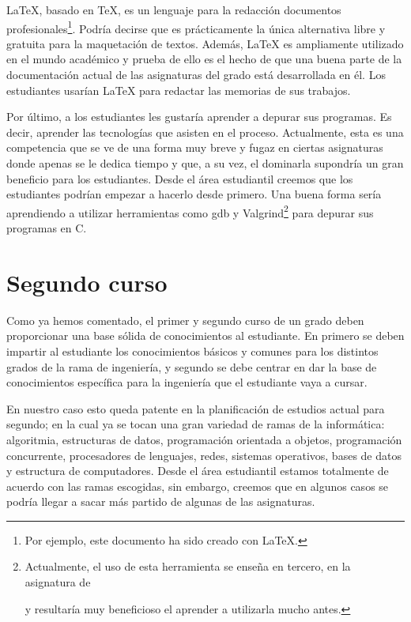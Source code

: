 \LaTeX, basado en \TeX, es un lenguaje para
la redacción documentos profesionales\footnote{
    Por ejemplo, este documento ha sido creado con \LaTeX.
}.
Podría decirse que es prácticamente la única alternativa
libre y gratuita para la maquetación de textos.
Además, \LaTeX{} es ampliamente utilizado en el mundo académico y prueba de
ello es el hecho de que una buena parte de la documentación actual de las
 asignaturas del grado está desarrollada en él.
Los estudiantes usarían \LaTeX{} para redactar las memorias de sus trabajos.

Por último, a los estudiantes les gustaría aprender a depurar sus programas.
Es decir, aprender las tecnologías que asisten en el proceso.
Actualmente, esta es una competencia que se ve de una forma muy breve y fugaz
en ciertas asignaturas donde apenas se le dedica tiempo y que, a su vez, el
dominarla supondría un gran beneficio para los estudiantes.
Desde el área estudiantil creemos que los estudiantes podrían empezar a
hacerlo desde primero.
Una buena forma sería
aprendiendo a utilizar herramientas como gdb y Valgrind\footnote{Actualmente,
 el uso de esta herramienta se enseña en tercero, en la asignatura de
 \subject{Ampliación de Sistemas Operativos} y resultaría muy beneficioso el
 aprender a utilizarla mucho antes.} para depurar sus programas en C.

\section{Segundo curso}

Como ya hemos comentado,
el primer y segundo curso de un grado deben proporcionar
una base sólida de conocimientos al estudiante.
En primero se deben impartir al estudiante
los conocimientos básicos y comunes para
los distintos grados de la rama de ingeniería,
y segundo se debe centrar en dar la base de conocimientos específica
para la ingeniería que el estudiante vaya a cursar.

En nuestro caso esto queda patente en
la planificación de estudios actual para segundo;
en la cual ya se tocan una gran variedad de ramas de la informática:
algoritmia, estructuras de datos, programación orientada a objetos,
programación concurrente, procesadores de lenguajes, redes, sistemas operativos,
bases de datos y estructura de computadores.
Desde el área estudiantil estamos totalmente de acuerdo con las ramas escogidas,
sin embargo, creemos que en algunos casos
se podría llegar a sacar más partido de algunas de las asignaturas.

